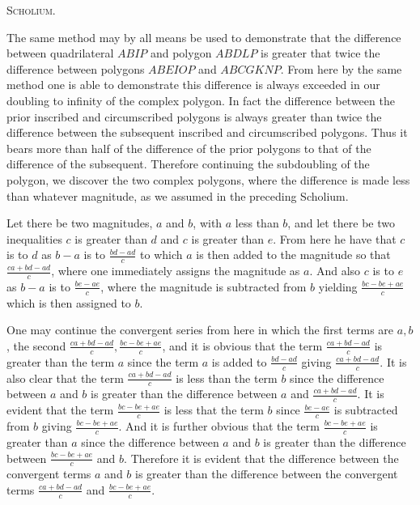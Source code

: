 \documentclass[11pt,letterpaper]{book}
\begin{document}
\begin{samepage}
\begin{center}
\large\textsc{Scholium.}
\end{center}

The same method may by all means be used to demonstrate that the difference
between quadrilateral $ABIP$ and polygon $ABDLP$ is greater that twice the
difference between polygons $ABEIOP$ and $ABCGKNP$. From here by the same method
one is able to demonstrate this difference is always exceeded in our doubling to
infinity of the complex polygon. In fact the difference between the prior
inscribed and circumscribed polygons is always greater than twice the difference
between the subsequent inscribed and circumscribed polygons. Thus it
bears more than half of the difference of the prior polygons to that of the
difference of the subsequent. Therefore continuing the subdoubling of the
polygon, we discover the two complex polygons, where the difference is made less
than whatever magnitude, as we assumed in the preceding Scholium.
\end{samepage}

Let there be two magnitudes, $a$ and $b$, with $a$ less than $b$, and let there
be two inequalities $c$ is greater than $d$ and $c$ is greater than $e$. From
here he have that $c$ is to $d$ as $b - a$ is to $\frac{bd - ad}{c}$ to which
$a$ is then added to the magnitude so that $\frac{ca + bd - ad}{c}$, where one
immediately assigns the magnitude as $a$. And also $c$ is to $e$ as $b - a$ is
to $\frac{be - ae}{c}$, where the magnitude is subtracted from $b$ yielding
$\frac{bc - be + ae}{c}$ which is then assigned to $b$.

One may continue the convergent series from here in which the first terms are
$a, b$, the second $\frac{ca+bd-ad}{c}, \frac{bc-be+ae}{c}$, and it is obvious
that the term $\frac{ca+bd-ad}{c}$ is greater than the term $a$ since the term
$a$ is added to $\frac{bd-ad}{c}$ giving $\frac{ca+bd-ad}{c}$. It is also clear
that the term $\frac{ca+bd-ad}{c}$ is less than the term $b$ since the
difference between $a$ and $b$ is greater than the difference between $a$ and
$\frac{ca+bd-ad}{c}$. It is evident that the term $\frac{bc-be+ae}{c}$ is less
that the term $b$ since $\frac{be-ae}{c}$ is subtracted from $b$ giving
$\frac{bc-be+ae}{c}$. And it is further obvious that the term
$\frac{bc-be+ae}{c}$ is greater than $a$ since the difference between $a$ and
$b$ is greater than the difference between $\frac{bc-be+ae}{c}$ and $b$.
Therefore it is evident that the difference between the convergent terms $a$ and
$b$ is greater than the difference between the convergent terms
$\frac{ca+bd-ad}{c}$ and $\frac{bc-be+ae}{c}$.
\end{document}
